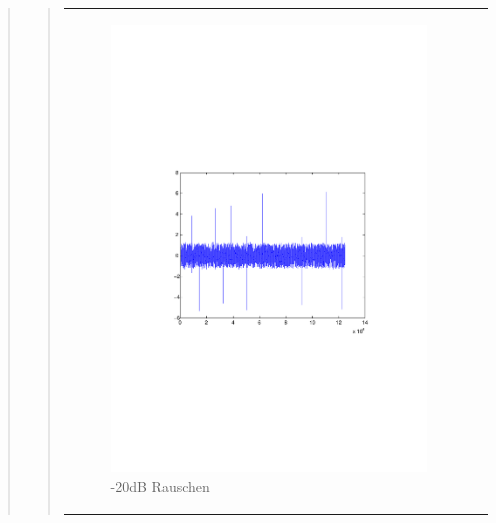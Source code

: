 \begin{quote}
\begin{quote}
\begin{center}
\begin{tabular}{ll}
\begin{minipage}{0.6\textwidth}
                       \begin{figure}[H]
                           \includegraphics[scale=0.6, trim = 35mm 85mm 40mm 95mm, clip]{./Bilder/Rauschen-20dB}
                           \caption{-20dB Rauschen}
                       \end{figure}
        
                   \end{minipage}
        

\end{tabular}
\end{center}
\end{quote}
\end{quote}
